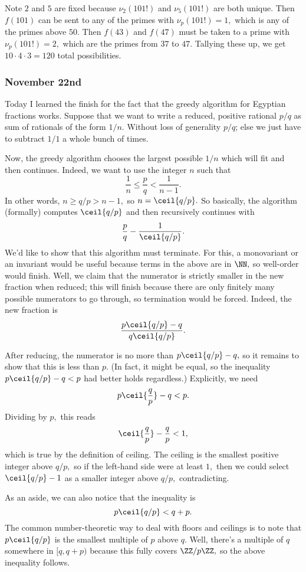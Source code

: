 Note $2$ and $5$ are fixed because $\nu_2(101!)$ and $\nu_5(101!)$ are both unique. Then $f(101)$ can be sent to any of the primes with $\nu_p(101!)=1,$ which is any of the primes above $50.$ Then $f(43)$ and $f(47)$ must be taken to a prime with $\nu_p(101!)=2,$ which are the primes from $37$ to $47.$ Tallying these up, we get $10\cdot4\cdot3=120$ total possibilities.

\subsubsection{November 22nd}
Today I learned the finish for the fact that the greedy algorithm for Egyptian fractions works. Suppose that we want to write a reduced, positive rational $p/q$ as sum of rationals of the form $1/n.$ Without loss of generality $p/q$; else we just have to subtract $1/1$ a whole bunch of times.

Now, the greedy algorithm chooses the largest possible $1/n$ which will fit and then continues. Indeed, we want to use the integer $n$ such that
\[\frac1n\le\frac pq<\frac1{n-1}.\]
In other words, $n\ge q/p>n-1,$ so $n=\ceil{q/p}.$ So basically, the algorithm (formally) computes $\ceil{q/p}$ and then recursively continues with
\[\frac pq-\frac1{\ceil{q/p}}.\]
We'd like to show that this algorithm must terminate. For this, a monovariant or an invariant would be useful because terms in the above are in $\NN,$ so well-order would finish. Well, we claim that the numerator is strictly smaller in the new fraction when reduced; this will finish because there are only finitely many possible numerators to go through, so termination would be forced. Indeed, the new fraction is
\[\frac{p\ceil{q/p}-q}{q\ceil{q/p}}.\]

After reducing, the numerator is no more than $p\ceil{q/p}-q,$ so it remains to show that this is less than $p.$ (In fact, it might be equal, so the inequality $p\ceil{q/p}-q<p$ had better holds regardless.) Explicitly, we need
\[p\ceil{\frac qp}-q<p.\]
Dividing by $p,$ this reads
\[\ceil{\frac qp}-\frac qp<1,\]
which is true by the definition of ceiling. The ceiling is the smallest positive integer above $q/p,$ so if the left-hand side were at least $1,$ then we could select $\ceil{q/p}-1$ as a smaller integer above $q/p,$ contradicting.

As an aside, we can also notice that the inequality is
\[p\ceil{q/p}<q+p.\]
The common number-theoretic way to deal with floors and ceilings is to note that $p\ceil{q/p}$ is the smallest multiple of $p$ above $q.$ Well, there's a multiple of $q$ somewhere in $[q,q+p)$ because this fully covers $\ZZ/p\ZZ,$ so the above inequality follows.

